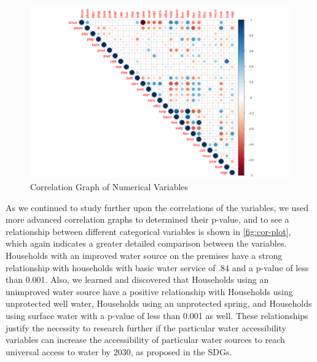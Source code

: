 \documentclass[10pt,twoside]{article}
\numberwithin{equation}{section}
\newcommand{\?}{\stackrel{?}{=}}
\begin{document}
\begin{figure}[h!]
  \centering
  \includegraphics[width=.7\textwidth]{correlation-basic}
  \caption{Correlation Graph of Numerical Variables}
  \label{fig:cor-basic}
\end{figure}
As we continued to study further upon the correlations of the variables, we used more advanced correlation graphs to determined their p-value, and to see a relationship between different categorical variables is shown in \autoref{fig:cor-plot}, which again indicates a greater detailed comparison between the variables. Households with an improved water source on the premises have a strong relationship with households with basic water service of .84 and a p-value of less than 0.001. Also, we learned and discovered that Households using an unimproved water source have a positive relationship with Households using unprotected well water, Households using an unprotected spring, and Households using surface water with a p-value of less than 0.001 as well. These relationships justify the necessity to research further if the particular water accessibility variables can increase the accessibility of particular water sources to reach universal access to water by 2030, as proposed in the SDGs. 
\end{document}

